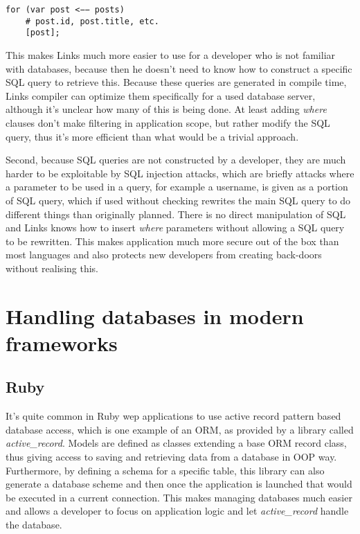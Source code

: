 \begin{codelisting}
\begin{verbatim}
for (var post <−− posts)
    # post.id, post.title, etc.
    [post];
\end{verbatim}
\end{codelisting}

This makes Links much more easier to use for a developer who is not familiar with databases, because then he doesn't need to know how to construct a specific SQL query to retrieve this. Because these queries are generated in compile time, Links compiler can optimize them specifically for a used database server, although it's unclear how many of this is being done. At least adding \textit{where} clauses don't make filtering in application scope, but rather modify the SQL query, thus it's more efficient than what would be a trivial approach.

Second, because SQL queries are not constructed by a developer, they are much harder to be exploitable by SQL injection\citep{sql-injection} attacks, which are briefly attacks where a parameter to be used in a query, for example a username, is given as a portion of SQL query, which if used without checking rewrites the main SQL query to do different things than originally planned. There is no direct manipulation of SQL and Links knows how to insert \textit{where} parameters without allowing a SQL query to be rewritten. This makes application much more secure out of the box than most languages and also protects new developers from creating back-doors without realising this. 

\section{Handling databases in modern frameworks}

\subsection{Ruby}

It's quite common in Ruby wep applications to use active record\citep{map-reduce} pattern based database access, which is one example of an ORM, as provided by a library called \textit{active\_record}. Models are defined as classes extending a base ORM record class, thus giving access to saving and retrieving data from a database in OOP way. Furthermore, by defining a schema for a specific table, this library can also generate a database scheme and then once the application is launched that would be executed in a current connection. This makes managing databases much easier and allows a developer to focus on application logic and let \textit{active\_record} handle the database.

